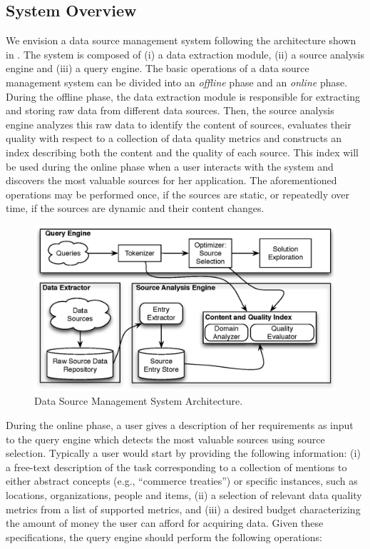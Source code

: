 \documentclass{sig-alternate}
\begin{document}
\subsection{System Overview}
\label{sec:architecture}
We envision a data source management system following the architecture shown in . The system is composed of (i) a data extraction module, (ii) a source analysis engine and (iii) a query engine. The basic operations of a data source management system can be divided into an {\em offline} phase and an {\em online} phase. During the offline phase, the data extraction module is responsible for extracting and storing raw data from different data sources. Then, the source analysis engine analyzes this raw data to identify the content of sources, evaluates their quality with respect to a collection of data quality metrics and constructs an index describing both the content and the quality of each source. This index will be used during the online phase when a user interacts with the system and discovers the most valuable sources for her application. The aforementioned operations may be performed once, if the sources are static, or repeatedly over time, if the sources are dynamic and their content changes. 
\begin{figure}
	\begin{center}
	\includegraphics[clip,scale=0.47]{fig/system.eps}
	\vspace{-20pt}
	\caption{Data Source Management System Architecture.}
	\label{fig:system}
	\end{center}
	\vspace{-20pt}
\end{figure}
During the online phase, a user gives a description of her requirements as input to the query engine which detects the most valuable sources using source selection. Typically a user would start by providing the following information: (i) a free-text description of the task corresponding to a collection of mentions to either abstract concepts (e.g., ``commerce treaties'') or specific instances, such as locations, organizations, people and items, (ii) a selection of relevant data quality metrics from a list of supported metrics, and (iii) a desired budget characterizing the amount of money the user can afford for acquiring data. Given these specifications, the query engine should perform the following operations:
\end{document}
